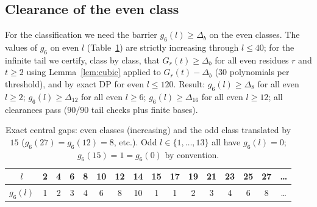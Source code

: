\documentclass[11pt,reqno]{article}
\theoremstyle{definition}
\begin{document}
\subsection{Clearance of the even class}\label{sec:clearance}
For the classification we need the barrier $g_6(l)\ge\Delta_b$ on the even classes. The values of $g_6$ on even $l$ (Table~\ref{tab:g6}) are strictly increasing through $l\le 40$; for the infinite tail we certify, class by class, that $G_r(t)\ge\Delta_b$ for all even residues $r$ and $t\ge2$ using Lemma~\ref{lem:cubic} applied to $G_r(t)-\Delta_b$ ($30$ polynomials per threshold), and by exact DP for even $l\le120$. Result: $g_6(l)\ge\Delta_8$ for all even $l\ge2$; $g_6(l)\ge\Delta_{12}$ for all even $l\ge6$; $g_6(l)\ge\Delta_{16}$ for all even $l\ge12$; all clearances pass ($90/90$ tail checks plus finite bases).

\begin{table}[h]
\centering
\begin{tabular}{c|ccccccccccccccc}
$l$&2&4&6&8&10&12&14&15&17&19&21&23&25&27&\dots\\ \hline
$g_6(l)$&1&2&3&4&6&8&10&1&1&2&3&4&6&8&\dots
\end{tabular}
\caption{Exact central gaps: even classes (increasing) and the odd class translated by $15$ ($g_6(27)=g_6(12)=8$, etc.). Odd $l\in\{1,\dots,13\}$ all have $g_6(l)=0$; $g_6(15)=1=g_6(0)$ by convention.}
\label{tab:g6}
\end{table}
\end{document}
